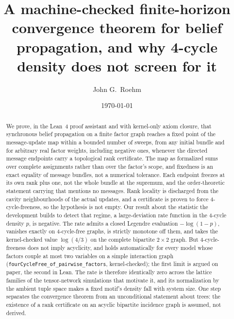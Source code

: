 \documentclass[aps,prx,reprint,nofootinbib,floatfix]{revtex4-2}
\begin{document}
\title{A machine-checked finite-horizon convergence theorem for belief
propagation, and why 4-cycle density does not screen for it}

\author{John G.~Roehm}

\date{\today}

\begin{abstract}
We prove, in the Lean~4 proof assistant and with kernel-only axiom closure,
that synchronous belief propagation on a finite factor graph reaches a fixed
point of the message-update map within a bounded number of sweeps, from any
initial bundle and for arbitrary real factor weights, including negative ones,
whenever the directed message endpoints carry a topological rank certificate.
The map as formalized sums over complete assignments rather than over the
factor's scope, and fixedness is an exact equality of message bundles, not a
numerical tolerance. Each endpoint freezes at its own rank plus one, not the
whole bundle at the supremum, and the order-theoretic statement carrying that
mentions no messages. Rank locality
is discharged from the cavity neighbourhoods of the actual updates, and a
certificate is proven to force 4-cycle-freeness, so the hypothesis is not empty.
Our result about the statistic the development builds to detect that regime, a
large-deviation rate function in the 4-cycle density $p$, is negative. The rate
admits a closed Legendre evaluation $-\log(1-p)$, vanishes exactly on
4-cycle-free graphs, is strictly monotone off them, and takes the kernel-checked
value $\log(4/3)$ on the complete bipartite $2{\times}2$ graph. But
4-cycle-freeness does not imply acyclicity, and holds automatically for every
model whose factors couple at most two variables on a simple interaction graph
(\texttt{fourCycleFree\_of\_pairwise\_factors}, kernel-checked); the first limit
is argued on paper, the second in Lean. The rate is therefore identically
zero across the lattice families of the tensor-network simulations that motivate
it, and its normalization by the ambient tuple space makes a fixed motif's
density fall with system size. One step separates the convergence theorem from an
unconditional statement about trees: the existence of a rank certificate on an
acyclic bipartite incidence graph is assumed, not derived.
\end{abstract}

\maketitle
\end{document}
